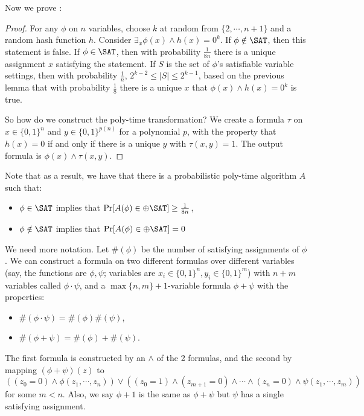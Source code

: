 Now we prove :
\begin{proof}
For any $\phi$ on $n$ variables, choose $k$ at random from $\{2, \cdots, n+1\}$ and a random hash function $h$. Consider $\exists_{x} \phi(x) \wedge h(x) = 0^k$. If $\phi \notin \SAT$, then this statement is false. If $\phi \in \SAT$, then with probability $\frac{1}{8n}$ there is a unique assignment $x$ satisfying the statement. If $S$ is the set of $\phi$'s satisfiable variable settings, then with probability $\frac{1}{n}$, $2^{k-2} \le |S| \le 2^{k-1}$, based on the previous lemma that with probability $\frac{1}{8}$ there is a unique $x$ that $\phi(x) \wedge h(x) = 0^k$ is true.

\par So how do we construct the poly-time transformation? We create a formula $\tau$ on $x \in \{0, 1\}^n$ and $y \in \{0, 1\}^{p(n)}$ for a polynomial $p$, with the property that $h(x) = 0$ if and only if there is a unique $y$ with $\tau(x, y) = 1$. The output formula is $\phi(x) \wedge \tau(x, y)$. 
\end{proof}

Note that as a result, we have that there is a probabilistic poly-time algorithm $A$ such that:
\begin{itemize}
\item $\phi \in \SAT$ implies that $\Pr[A(\phi) \in \ParitySAT] \ge \frac{1}{8n}$,
\item $\phi \notin \SAT$ implies that $\Pr[A(\phi) \in \ParitySAT] = 0$
\end{itemize}

We need more notation. Let $\#(\phi)$ be the number of satisfying assignments of $\phi$. We can construct a formula on two different formulas over different variables (say, the functions are $\phi, \psi$; variables are $x_i \in \{0, 1\}^n, y_i \in \{0, 1\}^m$) with $n+m$ variables called $\phi \cdot \psi$, and a $\max\{n, m\}+1$-variable formula $\phi+\psi$ with the properties:
\begin{itemize}
\item $\#(\phi \cdot \psi) = \#(\phi)\#(\psi)$,
\item $\#(\phi+\psi) = \#(\phi)+\#(\psi)$.
\end{itemize}
The first formula is constructed by an $\wedge$ of the 2 formulas, and the second by mapping $(\phi+\psi)(z)$ to $((z_0=0) \wedge \phi(z_1, \cdots, z_n)) \vee ((z_0=1) \wedge (z_{m+1} = 0) \wedge \cdots \wedge (z_n = 0) \wedge \psi(z_1, \cdots, z_m))$ for some $m < n$. Also, we say $\phi+1$ is the same as $\phi+\psi$ but $\psi$ has a single satisfying assignment. 

